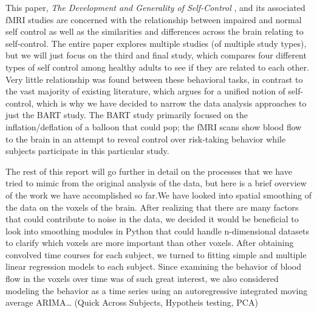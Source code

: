 \par This paper, \textit{The Development and Generality of Self-Control} \cite{CohenSelfControl},  and its associated fMRI studies are concerned with the relationship between impaired and normal self control as well as the similarities and differences across the brain relating to self-control. The entire paper explores multiple studies (of multiple study types), but we will just focus on the third and final study, which compares four different types of self control among healthy adults to see if they are related to each other. Very little relationship was found between these behavioral tasks, in contrast to the vast majority of existing literature, which argues for a unified notion of self-control, which is why we have decided to narrow the data analysis approaches to just the BART study. The BART study primarily focused on the inflation/deflation of a balloon that could pop; the fMRI scans show blood flow to the brain in an attempt to reveal control over risk-taking behavior while subjects participate in this particular study.
\par The rest of this report will go further in detail on the processes that we have tried to mimic from the original analysis of the data, but here is a brief overview of the work we have accomplished so far.We have looked into spatial smoothing of the data on the voxels of the brain. After realizing that there are many factors that could contribute to noise in the data, we decided it would be beneficial to look into smoothing modules in Python that could handle n-dimensional datasets to clarify which voxels are more important than other voxels. After obtaining convolved time courses for each subject, we turned to fitting simple and multiple linear regression models to each subject. Since examining the behavior of blood flow in the voxels over time was of such great interest, we also considered modeling the behavior as a time series using an autoregressive integrated moving average ARIMA… (Quick Across Subjects, Hypotheis testing, PCA)
